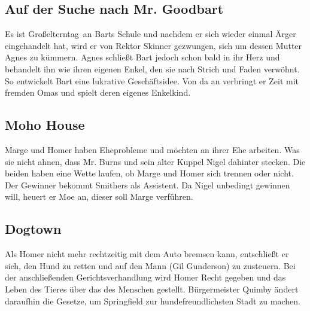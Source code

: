 \subsection{Auf der Suche nach Mr. Goodbart}\label{WABF13}
Es ist \glqq Großelterntag\grqq\ an Barts Schule und nachdem er sich wieder einmal Ärger eingehandelt hat, wird er von Rektor Skinner gezwungen, sich um dessen Mutter Agnes zu kümmern. Agnes schließt Bart jedoch schon bald in ihr Herz und behandelt ihn wie ihren eigenen Enkel, den sie nach Strich und Faden verwöhnt. So entwickelt Bart eine lukrative Geschäftsidee. Von da an verbringt er Zeit mit fremden Omas und spielt deren eigenes Enkelkind.


\subsection{Moho House}
Marge und Homer haben Eheprobleme und möchten an ihrer Ehe arbeiten. Was sie nicht ahnen, dass Mr. Burns und sein alter Kuppel Nigel dahinter stecken. Die beiden haben eine Wette laufen, ob Marge und Homer sich trennen oder nicht. Der Gewinner bekommt Smithers als Assistent. Da Nigel unbedingt gewinnen will, heuert er Moe an, dieser soll Marge verführen.


\subsection{Dogtown}\label{WABF15}
Als Homer nicht mehr rechtzeitig mit dem Auto bremsen kann, entschließt er sich, den Hund zu retten und auf den Mann (Gil Gunderson) zu zusteuern. Bei der anschließenden Gerichtsverhandlung wird Homer Recht gegeben und das Leben des Tieres über das des Menschen gestellt. Bürgermeister Quimby ändert daraufhin die Gesetze, um Springfield zur hundefreundlichsten Stadt zu machen.


